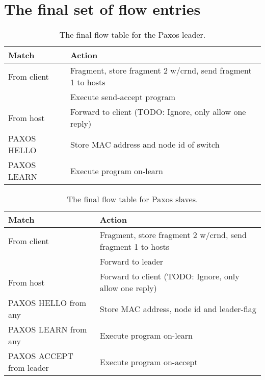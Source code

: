 \section{The final set of flow entries}
\label{chapter:final.flowtable}



\begin{table}[H]
  \centering
  \begin{tabular}{|l|l|}
    \hline \textbf{Match} & \textbf{Action} \\
    \hline From client & Fragment, store fragment 2 w/crnd, send fragment 1 to hosts \\
                       & Execute send-accept program \\
    \hline From host & Forward to client (TODO: Ignore, only allow one reply) \\
    \hline PAXOS HELLO & Store MAC address and node id of switch \\
    \hline PAXOS LEARN & Execute program on-learn \\
    \hline
  \end{tabular}
  \caption{The final flow table for the Paxos leader.}
  \label{table:complete.match.leader}
\end{table}

\begin{table}[H]
  \centering
  \begin{tabular}{|l|l|}
    \hline \textbf{Match} & \textbf{Action} \\
    \hline From client & Fragment, store fragment 2 w/crnd, send fragment 1 to hosts \\
                       & Forward to leader \\
    \hline From host & Forward to client (TODO: Ignore, only allow one reply) \\
    \hline PAXOS HELLO from any & Store MAC address, node id and leader-flag \\
    \hline PAXOS LEARN from any & Execute program on-learn \\
    \hline PAXOS ACCEPT from leader & Execute program on-accept \\
    \hline
  \end{tabular}
  \caption{The final flow table for Paxos slaves.}
  \label{table:complete.match.slave}
\end{table}

